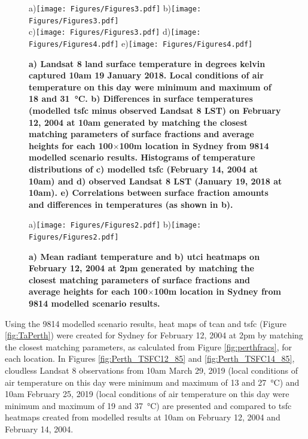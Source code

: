 \documentclass[final,3p,times,authoryear]{elsarticle}
\begin{document}
\begin{figure}  
\centering
a)\texttt{[image: Figures/Figures3.pdf]}
b)\texttt{[image: Figures/Figures3.pdf]}\\
c)\texttt{[image: Figures/Figures3.pdf]}
d)\texttt{[image: Figures/Figures4.pdf]}
e)\texttt{[image: Figures/Figures4.pdf]}
\caption{\bf a) Landsat 8 land surface temperature in degrees kelvin captured 10am 19 January 2018. Local conditions of air temperature on this day were minimum and maximum of 18 and 31\SI{}{\degreeCelsius}. b) Differences in surface temperatures (modelled \gls{tsfc} minus observed Landsat 8 LST) on February 12, 2004 at 10am generated by matching the closest matching parameters of surface fractions and average heights for each 100$\times$100m location in Sydney from 9814 modelled scenario results. Histograms of temperature distributions of c) modelled \gls{tsfc} (February 14, 2004 at 10am) and d) observed Landsat 8 LST (January 19, 2018 at 10am). e) Correlations between surface fraction amounts and differences in temperatures (as shown in b).}
 \label{fig:Sydney-Landsat-LST-19-01-2018}
 \label{fig:Sydney-Landsat-TSFC-LST-19-01-2018}
 \label{fig:Sydney_TSFC14_85}
\end{figure}



\begin{figure}
\centering
a)\texttt{[image: Figures/Figures2.pdf]}
b)\texttt{[image: Figures/Figures2.pdf]}
\caption{\bf a) Mean radiant temperature and b) \gls{utci}  heatmaps on February 12, 2004 at 2pm generated by matching the closest matching parameters of surface fractions and average heights for each 100$\times$100m location in Sydney from 9814 modelled scenario results.  }
 \label{fig:utciSyd}\label{fig:TmrtSyd}
\end{figure}





Using the 9814 modelled scenario results, heat maps of \gls{tcan} and \gls{tsfc} (Figure \ref{fig:TaPerth}) were created for Sydney for February 12, 2004 at 2pm by matching the closest matching parameters, as calculated from Figure \ref{fig:perthfracs}, for each location. In Figures \ref{fig:Perth_TSFC12_85} and \ref{fig:Perth_TSFC14_85}, cloudless Landsat 8 observations from 10am March 29, 2019 (local conditions of air temperature on this day were minimum and maximum of 13 and 27\SI{}{\degreeCelsius}) and 10am February 25, 2019 (local conditions of air temperature on this day were minimum and maximum of 19 and 37\SI{}{\degreeCelsius}) are presented and compared to \gls{tsfc} heatmaps created from modelled results at 10am on February 12, 2004 and February 14, 2004. 
\end{document}
